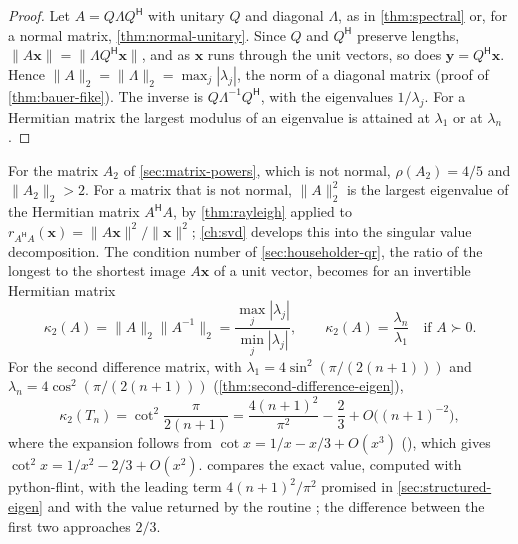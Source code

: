 \begin{proof}
Let $A=Q\Lambda Q^{\mathsf H}$ with unitary $Q$ and diagonal $\Lambda$, as in \cref{thm:spectral} or, for a normal matrix, \cref{thm:normal-unitary}. Since $Q$ and $Q^{\mathsf H}$ preserve lengths, $\|A\mathbf x\|=\|\Lambda Q^{\mathsf H}\mathbf x\|$, and as $\mathbf x$ runs through the unit vectors, so does $\mathbf y=Q^{\mathsf H}\mathbf x$. Hence $\|A\|_2=\|\Lambda\|_2=\max_j|\lambda_j|$, the norm of a diagonal matrix (proof of \cref{thm:bauer-fike}). The inverse is $Q\Lambda^{-1}Q^{\mathsf H}$, with the eigenvalues $1/\lambda_j$. For a Hermitian matrix the largest modulus of an eigenvalue is attained at $\lambda_1$ or at $\lambda_n$.
\end{proof}

For the matrix $A_2$ of \cref{sec:matrix-powers}, which is not normal, $\rho(A_2)=4/5$ and $\|A_2\|_2>2$. For a matrix that is not normal, $\|A\|_2^2$ is the largest eigenvalue of the Hermitian matrix $A^{\mathsf H}A$, by \cref{thm:rayleigh} applied to $r_{A^{\mathsf H}A}(\mathbf x)=\|A\mathbf x\|^2/\|\mathbf x\|^2$; \cref{ch:svd} develops this into the singular value decomposition. The condition number of \cref{sec:householder-qr}, the ratio of the longest to the shortest image $A\mathbf x$ of a unit vector, becomes for an invertible Hermitian matrix
\[
\kappa_2(A)=\|A\|_2\|A^{-1}\|_2=\frac{\max_j|\lambda_j|}{\min_j|\lambda_j|},\qquad\kappa_2(A)=\frac{\lambda_n}{\lambda_1}\quad\text{if }A\succ0 .
\]
For the second difference matrix, with $\lambda_1=4\sin^2(\pi/(2(n+1)))$ and $\lambda_n=4\cos^2(\pi/(2(n+1)))$ (\cref{thm:second-difference-eigen}),
\[
\kappa_2(T_n)=\cot^2\frac{\pi}{2(n+1)}=\frac{4(n+1)^2}{\pi^2}-\frac23+O\bigl((n+1)^{-2}\bigr),
\]
where the expansion follows from $\cot x=1/x-x/3+O(x^3)$ (), which gives $\cot^2x=1/x^2-2/3+O(x^2)$.  compares the exact value, computed with python-flint, with the leading term $4(n+1)^2/\pi^2$ promised in \cref{sec:structured-eigen} and with the value returned by the routine ; the difference between the first two approaches $2/3$.

\begin{table}
\end{table}

